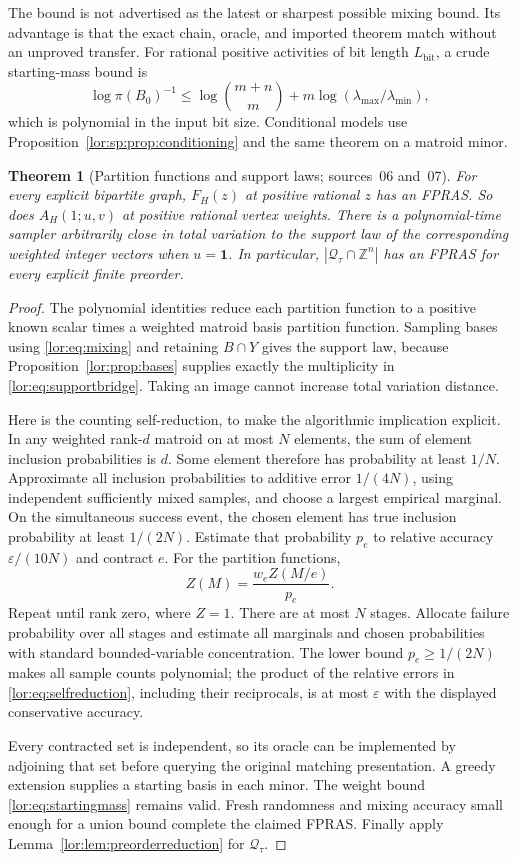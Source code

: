 \documentclass[11pt]{article}
\numberwithin{equation}{section}
\newtheorem{theorem}{Theorem}[section]
\theoremstyle{definition}
\newcommand{\Z}{\mathbb Z}
\newcommand{\Qt}{\mathcal Q_\tau}
\begin{document}
The bound is not advertised as the latest or sharpest possible mixing bound.
Its advantage is that the exact chain, oracle, and imported theorem match
without an unproved transfer. For rational positive activities of bit length
$L_{\mathrm{bit}}$, a crude starting-mass bound is
\[
 \log\pi(B_0)^{-1}\le\log\binom{m+n}{m}
       +m\log(\lambda_{\max}/\lambda_{\min}),
\]
which is polynomial in the input bit size. Conditional models use
Proposition~\ref{lor:sp:prop:conditioning} and the same theorem on a matroid minor.

\begin{theorem}[Partition functions and support laws; sources~06 and~07]\label{lor:thm:FPRASpartition}
For every explicit bipartite graph, $F_H(z)$ at positive rational $z$ has
an FPRAS. So does $A_H(1;u,v)$ at positive rational vertex weights. There
is a polynomial-time sampler arbitrarily close in total variation to the
support law of the corresponding weighted integer vectors when
$u=\mathbf1$. In particular, $|\Qt\cap\Z^n|$ has an FPRAS for every
explicit finite preorder.
\end{theorem}
\begin{proof}
The polynomial identities reduce each partition function to a positive
known scalar times a weighted matroid basis partition function. Sampling
bases using \eqref{lor:eq:mixing} and retaining $B\cap Y$ gives the support
law, because Proposition~\ref{lor:prop:bases} supplies exactly the multiplicity
in \eqref{lor:eq:supportbridge}. Taking an image cannot increase total
variation distance.

Here is the counting self-reduction, to make the algorithmic implication
explicit. In any weighted rank-$d$ matroid on at most $N$ elements, the sum
of element inclusion probabilities is $d$. Some element therefore has
probability at least $1/N$. Approximate all inclusion probabilities to
additive error $1/(4N)$, using independent sufficiently mixed samples, and
choose a largest empirical marginal. On the simultaneous success event,
the chosen element has true inclusion probability at least $1/(2N)$.
Estimate that probability $p_e$ to relative accuracy
$\varepsilon/(10N)$ and contract $e$. For the partition functions,
\begin{equation}
 Z(M)=\frac{w_eZ(M/e)}{p_e}.
 \label{lor:eq:selfreduction}
\end{equation}
Repeat until rank zero, where $Z=1$. There are at most $N$ stages. Allocate
failure probability over all stages and estimate all marginals and chosen
probabilities with standard bounded-variable concentration. The lower
bound $p_e\ge1/(2N)$ makes all sample counts polynomial; the product of the
relative errors in \eqref{lor:eq:selfreduction}, including their reciprocals,
is at most $\varepsilon$ with the displayed conservative accuracy.

Every contracted set is independent, so its oracle can be implemented by
adjoining that set before querying the original matching presentation.
A greedy extension supplies a starting basis in each minor. The weight
bound \eqref{lor:eq:startingmass} remains valid. Fresh randomness and mixing
accuracy small enough for a union bound complete the claimed FPRAS.
Finally apply Lemma~\ref{lor:lem:preorderreduction} for $\Qt$.
\end{proof}
\end{document}
